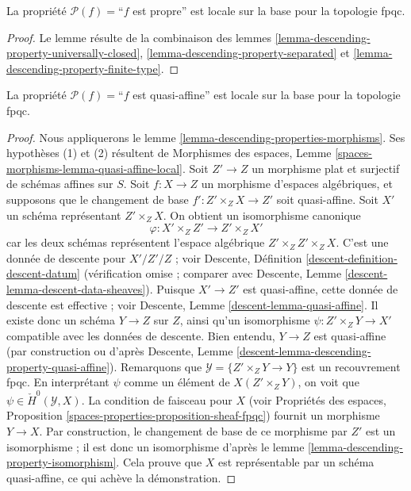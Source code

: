 \begin{lemma}
\label{lemma-descending-property-proper}
La propriété $\mathcal{P}(f) =$``$f$ est propre''
est locale sur la base pour la topologie fpqc.
\end{lemma}

\begin{proof}
Le lemme résulte de la combinaison des
lemmes \ref{lemma-descending-property-universally-closed},
\ref{lemma-descending-property-separated}
et \ref{lemma-descending-property-finite-type}.
\end{proof}

\begin{lemma}
\label{lemma-descending-property-quasi-affine}
La propriété $\mathcal{P}(f) =$``$f$ est quasi-affine''
est locale sur la base pour la topologie fpqc.
\end{lemma}

\begin{proof}
Nous appliquerons le
lemme \ref{lemma-descending-properties-morphisms}.
Ses hypothèses (1) et (2) résultent de
Morphismes des espaces,
Lemme \ref{spaces-morphisms-lemma-quasi-affine-local}.
Soit $Z' \to Z$ un morphisme plat et surjectif de schémas affines sur $S$.
Soit $f : X \to Z$ un morphisme d'espaces algébriques, et supposons
que le changement de base $f' : Z' \times_Z X \to Z'$ soit quasi-affine.
Soit $X'$ un schéma représentant $Z' \times_Z X$.
On obtient un isomorphisme canonique
$$
\varphi : X' \times_Z Z' \longrightarrow Z' \times_Z X'
$$
car les deux schémas représentent l'espace algébrique $Z' \times_Z Z' \times_Z X$.
C'est une donnée de descente pour $X'/Z'/Z$ ; voir
Descente, Définition \ref{descent-definition-descent-datum}
(vérification omise ; comparer avec
Descente, Lemme \ref{descent-lemma-descent-data-sheaves}).
Puisque $X' \to Z'$ est quasi-affine, cette donnée de descente est effective ; voir
Descente, Lemme \ref{descent-lemma-quasi-affine}.
Il existe donc un schéma $Y \to Z$ sur $Z$, ainsi qu'un
isomorphisme $\psi : Z' \times_Z Y \to X'$ compatible avec les données de descente.
Bien entendu, $Y \to Z$ est quasi-affine (par construction ou d'après
Descente, Lemme \ref{descent-lemma-descending-property-quasi-affine}).
Remarquons que $\mathcal{Y} = \{Z' \times_Z Y \to Y\}$ est un
recouvrement fpqc. En interprétant $\psi$ comme un élément de
$X(Z' \times_Z Y)$, on voit que $\psi \in \check{H}^0(\mathcal{Y}, X)$.
La condition de faisceau pour $X$ (voir
Propriétés des espaces, Proposition
\ref{spaces-properties-proposition-sheaf-fpqc})
fournit un morphisme $Y \to X$.
Par construction, le changement de base de ce morphisme par $Z'$ est un isomorphisme ; il est donc
un isomorphisme d'après le
lemme \ref{lemma-descending-property-isomorphism}.
Cela prouve que $X$ est représentable par un schéma quasi-affine, ce qui achève la démonstration.
\end{proof}

